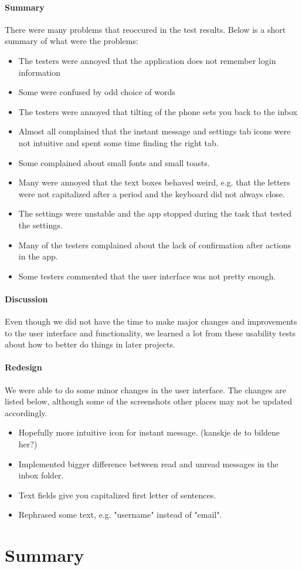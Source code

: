 \paragraph{Summary}\hfill
\newline
			There were many problems that reoccured in the test results. Below is a short summary of what were the problems:
			\begin{itemize}
				\item{}The testers were annoyed that the application does not remember login information
				\item{}Some were confused by odd choice of words
				\item{}The testers were annoyed that tilting of the phone sets you back to the inbox
				\item{}Almost all complained that the instant message and settings tab icons were not intuitive and spent some time finding the right tab.
				\item{}Some complained about small fonts and small toasts.
				\item{}Many were annoyed that the text boxes behaved weird, e.g. that the letters were not capitalized after a period and the keyboard did not always close. 
				\item{}The settings were unstable and the app stopped during the task that tested the settings.
				\item{}Many of the testers complained about the lack of confirmation after actions in the app.
				\item{}Some testers commented that the user interface was not pretty enough.
			\end{itemize}
		\paragraph{Discussion}\hfill
\newline
Even though we did not have the time to make major changes and improvements to the user interface and functionality, we learned a lot from these usability tests about how to better do things in later projects.
		
\paragraph{Redesign}\hfill
\newline
		We were able to do some minor changes in the user interface. The changes are listed below, although some of the screenshots other places may not be updated accordingly.
		\begin{itemize}
			\item{}Hopefully more intuitive icon for instant message. (kanskje de to bildene her?)
			\item{}Implemented bigger difference between read and unread messages in the inbox folder.
			\item{}Text fields give you capitalized first letter of sentences.
			\item{}Rephrased some text, e.g. "username" instead of "email".
		\end{itemize}


\section{Summary}
